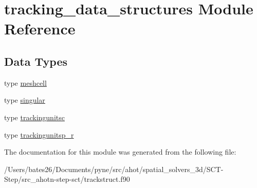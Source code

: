 \hypertarget{classtracking__data__structures}{\section{tracking\+\_\+data\+\_\+structures Module Reference}
\label{classtracking__data__structures}
}
\subsection*{Data Types}
\begin{DoxyCompactItemize}
\item 
type \hyperlink{structtracking__data__structures_1_1meshcell}{meshcell}
\item 
type \hyperlink{structtracking__data__structures_1_1singular}{singular}
\item 
type \hyperlink{structtracking__data__structures_1_1trackingunitsc}{trackingunitsc}
\item 
type \hyperlink{structtracking__data__structures_1_1trackingunitsp__r}{trackingunitsp\+\_\+r}
\end{DoxyCompactItemize}


The documentation for this module was generated from the following file\+:\begin{DoxyCompactItemize}
\item 
/\+Users/bates26/\+Documents/pyne/src/ahot/spatial\+\_\+solvers\+\_\+3d/\+S\+C\+T-\/\+Step/src\+\_\+ahotn-\/step-\/sct/trackstruct.\+f90\end{DoxyCompactItemize}
